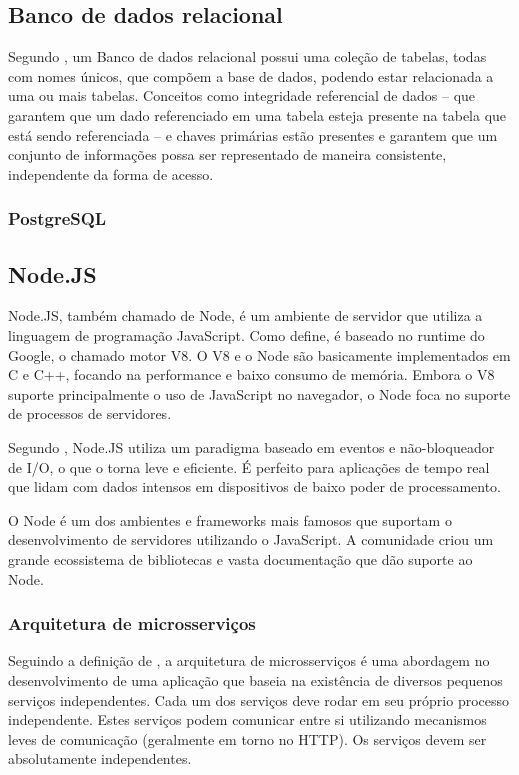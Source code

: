 \subsection{Banco de dados relacional}

Segundo \cite{bancosrelacionais}, um Banco de dados relacional possui uma coleção de tabelas, todas com nomes únicos, que compõem a base de
dados, podendo estar relacionada a uma ou mais tabelas. Conceitos como integridade referencial de dados – que garantem que um dado referenciado em uma tabela esteja presente na tabela que está sendo referenciada – e chaves primárias estão presentes e garantem que um conjunto de informações possa ser representado de maneira consistente, independente da forma de acesso.

\subsubsection{PostgreSQL}

\subsection{Node.JS}

Node.JS, também chamado de Node, é um ambiente de servidor que utiliza a linguagem de programação JavaScript. Como \cite{Tilkov2010} define, é baseado no runtime do Google, o chamado motor V8. O V8 e o Node são basicamente implementados em C e C++, focando na performance e baixo consumo de memória. Embora o V8 suporte principalmente o uso de JavaScript no navegador, o Node foca no suporte de processos de servidores.

Segundo \cite{Sapes2016}, Node.JS utiliza um paradigma baseado em eventos e não-bloqueador de I/O, o que o torna leve e eficiente. É perfeito para aplicações de tempo real que lidam com dados intensos em dispositivos de baixo poder de processamento.

O Node é um dos ambientes e frameworks mais famosos que suportam o desenvolvimento de servidores utilizando o JavaScript. A comunidade criou um grande ecossistema de bibliotecas e vasta documentação que dão suporte ao Node. \cite{Tilkov2010}

\subsubsection{Arquitetura de microsserviços}

Seguindo a definição de \cite{ms1}, a arquitetura de microsserviços é uma abordagem no desenvolvimento de uma aplicação que baseia na existência de diversos pequenos serviços independentes. Cada um dos serviços deve rodar em seu próprio processo independente. Estes serviços podem comunicar entre si utilizando mecanismos leves de comunicação (geralmente em torno no HTTP). Os serviços devem ser absolutamente independentes.

